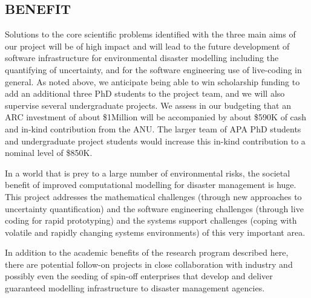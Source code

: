 \subsection*{BENEFIT}


Solutions to the core scientific problems identified with the three main aims of our project will be of high impact and will lead to the future development of  software infrastructure for environmental disaster modelling including the quantifying of uncertainty, and for the software engineering use of live-coding in general. As noted above, we anticipate being able to win scholarship funding to add an additional three PhD students to the project team, and we will also supervise several undergraduate projects.  We assess in our budgeting that an ARC investment of about  \$1Million will be accompanied by about  \$590K of cash and in-kind contribution from the ANU. The larger team of APA PhD students and undergraduate project students would increase this in-kind contribution to a nominal level of \$850K. 
  

In a world that is prey to a large number of environmental risks,
the societal benefit of improved computational modelling for disaster management is huge.
This project addresses the mathematical challenges (through new approaches
to uncertainty quantification) and the software engineering challenges (through live coding
 for rapid prototyping) and the systems support challenges (coping with volatile and 
 rapidly changing systems environments) of this very important area.
 
In addition to the academic benefits of the research program described here, there are potential follow-on projects in close
collaboration with industry and possibly even the seeding of spin-off enterprises that develop and deliver guaranteed modelling infrastructure to disaster management
agencies.

\iffalse
This research is aims to unlock the power of sophisticated
computational simulation incorporating uncertainty for
\emph{interactive} use.  Although we concentrate our research on
simulation support for disaster response, the ultimate potential of
this work is to eventually empower domain experts from a broad range
of areas to better use the high-performance computing power which is
now available to them. We envision a future where performing a complex
flood model or disaster simulation is as interactive and \emph{alive}
as flicking through photos on a tablet.\\



There are several benefits arising from the successful completion of
this project. They include, economic, societal as well as
environmental along with the generation of new knowledge:
\begin{itemize}
\item Reduced economic losses from disasters such as flooding
\item Reduced property damage from disasters
\item Reduced loss of life from disasters
\item New knowledge in the understanding of disaster modelling, and
  hence forecasting.
\end{itemize}
\fi